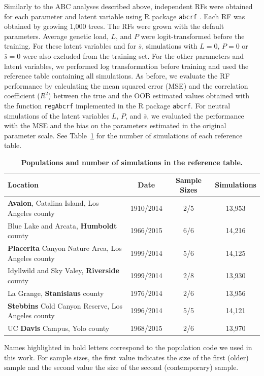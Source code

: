\documentclass[a4paper, 12pt]{article}
\begin{document}
Similarly to the ABC analyses described above, independent RFs were obtained for each parameter and latent variable using R package \texttt{abcrf} \citep{Pudlo:2016il, Raynal:2019jj}. Each RF was obtained by growing 1,000 trees. The RFs were grown with the default parameters. Average genetic load, $L$, and $P$ were logit-transformed before the training. For these latent variables and for $\bar{s}$, simulations with $L=0$, $P=0$ or $\bar{s} = 0$ were also excluded from the training set. For the other parameters and latent variables, we performed log transformation before training and used the reference table containing all simulations. As before, we evaluate the RF performance by calculating the mean squared error (MSE) and the correlation coefficient ($R^2$) between the true and the OOB estimated values obtained with the function \texttt{regAbcrf} implemented in the R package \texttt{abcrf}. For neutral simulations of the latent variables $L$, $P$, and $\bar{s}$, we evaluated the performance with the MSE and the bias on the parameters estimated in the original parameter scale. See Table~\ref{tab:feralbees} for the number of simulations of each reference table. 

\begin{table}[!ht]
\small
 \caption{\textbf{Populations and number of simulations in the reference table.}}
  \centering
  \begin{tabular}{lccc}
   \cmidrule(r){1-4}
    Location                                                  &Date      &Sample Sizes   &Simulations \\
    \midrule               
    \textbf{Avalon}, Catalina Island, Los Angeles county      &1910/2014 &2/5 &13,953      \\ 
    Blue Lake and Arcata, \textbf{Humboldt} county            &1966/2015 &6/6 &14,216      \\ 
    \textbf{Placerita} Canyon Nature Area, Los Angeles county &1999/2014 &5/6 &14,125      \\ 
    Idyllwild and Sky Valey, \textbf{Riverside} county        &1999/2014 &2/8 &13,930      \\ 
    La Grange, \textbf{Stanislaus} county                     &1976/2014 &2/6 &13,956      \\ 
    \textbf{Stebbins} Cold Canyon Reserve, Los Angeles county &1996/2014 &5/5 &14,121      \\ 
    UC \textbf{Davis} Campus, Yolo county                     &1968/2015 &2/6 &13,970      \\ 
    \bottomrule
  \end{tabular}
  \begin{tablenotes}
      \footnotesize
      \item Names highlighted in bold letters correspond to the population code we used in this work. For sample sizes, the first value indicates the size of the first (older) sample and the second value the size of the second (contemporary) sample.
  
  \end{tablenotes}
  \label{tab:feralbees}
\end{table}
\end{document}
